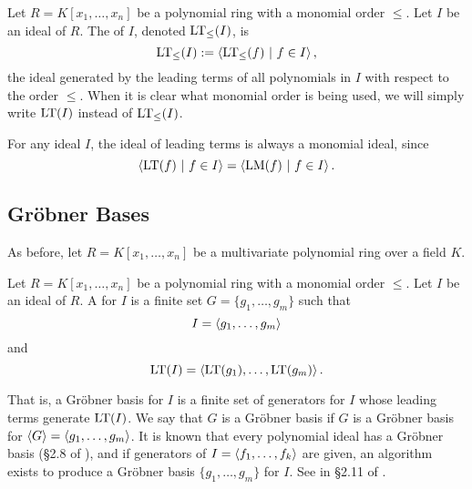 \begin{definition}
  Let $R = K[x_1, \ldots, x_n]$ be a polynomial ring with a monomial order $\leq$.
  Let $I$ be an ideal of $R$.
  The  of $I$, denoted $\operatorname{LT}_\leq(I)$, is
  \begin{equation*}
    \operatorname{LT}_\leq(I) := \left\langle  \operatorname{LT}_\leq(f) ~|~ f \in I  \right\rangle,
  \end{equation*}
  the ideal generated by the leading terms of all polynomials in $I$ with respect to the order $\leq$.
  When it is clear what monomial order is being used, we will simply write $\operatorname{LT}(I)$ instead of $\operatorname{LT}_\leq(I)$.
\end{definition}
For any ideal $I$, the ideal of leading terms is always a monomial ideal, since
\[ \left\langle  \operatorname{LT}(f) ~|~ f \in I  \right\rangle = \left\langle  \operatorname{LM}(f) ~|~ f \in I  \right\rangle. \]




\subsection{Gr\"obner Bases} \label{sec:groebner_bases}

As before, let $R = K[x_1, \ldots, x_n]$ be a multivariate polynomial ring over a field $K$.

\begin{definition}
  \label{def_groebner_basis}
  Let $R = K[x_1, \ldots, x_n]$ be a polynomial ring with a monomial order $\leq$.
  Let $I$ be an ideal of $R$.
  A  for $I$ is a finite set $G = \{ g_1, \ldots, g_m \}$ such that
    \[ I = \left\langle  g_1, \ldots, g_m  \right\rangle \]
  and
    \[ \operatorname{LT}(I) = \left\langle  \operatorname{LT}(g_1), \ldots, \operatorname{LT}(g_m)  \right\rangle. \]
\end{definition}
That is, a Gr\"obner basis for $I$ is a finite set of generators for $I$ whose leading terms generate $\operatorname{LT}(I)$.
We say that $G$ is a Gr\"obner basis if $G$ is a Gr\"obner basis for $\left\langle G \right\rangle = \left\langle g_1, \ldots, g_m \right\rangle$.
It is known that every polynomial ideal has a Gr\"obner basis (\S 2.8 of \cite{buchberger98}),
and if generators of $I = \left\langle f_1, \ldots, f_k \right\rangle$ are given,
an algorithm exists to produce a Gr\"obner basis $\{g_1, \ldots, g_m\}$ for $I$.
See  in \S 2.11 of \cite{buchberger98}.

